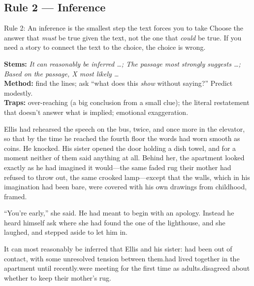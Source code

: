 \documentclass[11pt]{article}
\begin{document}
\subsection{Rule 2 --- Inference}
\begin{rulebox}{Rule 2: An inference is the smallest step the text forces you to take}
Choose the answer that \emph{must} be true given the text, not the one that \emph{could} be true. If you need a story to connect the text to the choice, the choice is wrong.
\end{rulebox}
\textbf{Stems:} \emph{It can reasonably be inferred \dots; The passage most strongly suggests \dots; Based on the passage, X most likely \dots}\\
\textbf{Method:} find the lines; ask ``what does this \emph{show} without saying?'' Predict modestly.\\
\textbf{Traps:} over-reaching (a big conclusion from a small clue); the literal restatement that doesn't answer what is implied; emotional exaggeration.

\begin{passage}
Ellis had rehearsed the speech on the bus, twice, and once more in the elevator, so that by the time he reached the fourth floor the words had worn smooth as coins. He knocked. His sister opened the door holding a dish towel, and for a moment neither of them said anything at all. Behind her, the apartment looked exactly as he had imagined it would---the same faded rug their mother had refused to throw out, the same crooked lamp---except that the walls, which in his imagination had been bare, were covered with his own drawings from childhood, framed.

``You're early,'' she said. He had meant to begin with an apology. Instead he heard himself ask where she had found the one of the lighthouse, and she laughed, and stepped aside to let him in.
\end{passage}

{It can most reasonably be inferred that Ellis and his sister:}
{had been out of contact, with some unresolved tension between them.}{had lived together in the apartment until recently.}{were meeting for the first time as adults.}{disagreed about whether to keep their mother's rug.}
\end{document}
